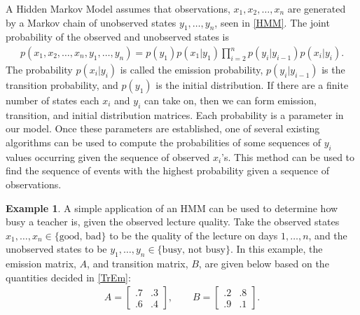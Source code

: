 \documentclass{article}
\numberwithin{equation}{section}
\theoremstyle{definition}
\newtheorem{example}[example]{Example}
\begin{document}


\noindent A Hidden Markov Model assumes that observations, $x_1,x_2,\dots,x_n$ are generated by a Markov chain of unobserved states $y_1,\dots,y_n$, seen in \autoref{HMM}. The joint probability of the observed and unobserved states is
\begin{align*}
    p(x_1,x_2,\dots,x_n,y_1,\dots,y_n) = p(y_1)p(x_1|y_1) \prod_{i=2}^n p(y_i|y_{i-1})p(x_i|y_i).
\end{align*}
The probability $p(x_i|y_i)$ is called the emission probability, $p(y_{i}|y_{i-1})$ is the transition probability, and $p(y_1)$ is the initial distribution. If there are a finite number of states each $x_i$ and $y_i$ can take on, then we can form emission, transition, and initial distribution matrices. Each probability is a parameter in our model. Once these parameters are established, one of several existing algorithms can be used to compute the probabilities of some sequences of $y_i$ values occurring given the sequence of observed $x_i$'s. This method can be used to find the sequence of events with the highest probability given a sequence of observations.

\begin{example} \label{Transition and Emission probabilities}
A simple application of an HMM can be used to determine how busy a teacher is, given the observed lecture quality. Take the observed states $x_1,\dots,x_n\in \{\text{good, bad}\}$ to be the quality of the lecture on days $1,\dots, n$, and the unobserved states to be $y_1,\dots,y_n\in \{\text{busy, not busy}\}$. In this example, the emission matrix, $A$, and transition matrix, $B$, are given below based on the quantities decided in \autoref{TrEm}:
\begin{align*}
    A = \begin{bmatrix}
    .7 & .3 \\
    .6 & .4 
    \end{bmatrix} , \qquad 
     B = \begin{bmatrix}
    .2 & .8 \\
    .9 & .1
    \end{bmatrix}. 
\end{align*}
\end{example}
\end{document}
